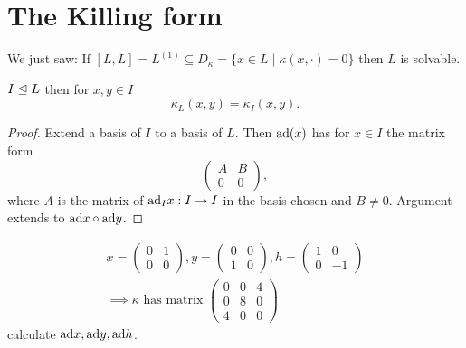 \section{The Killing form}
We just saw: If $[L,L]=L^{(1)} \subseteq D_\kappa=\{x \in L \mid \kappa(x, \cdot)=0\}$
then $L$ is solvable.

\begin{lemma}
    $I \trianglelefteq L$ then for $x,y \in I$
    $$ \kappa_L(x,y) = \kappa_I(x,y).$$
\end{lemma}
\begin{proof}
    Extend a basis of $I$ to a basis of $L$. Then $\text{ad} (x)$ has for $x \in I$ the matrix form
    $$ \begin{pmatrix}
        A & B\\
        0 & 0
    \end{pmatrix},$$
    where $A$ is the matrix of $\text{ad}_I x: I \to I$ in the basis chosen and $B \neq 0$.
    Argument extends to $\text{ad} x \circ \text{ad} y$.
\end{proof}

\begin{example}
    \begin{align*}
        x = \begin{pmatrix}
            0 & 1\\
            0 & 0
        \end{pmatrix},
        y = \begin{pmatrix}
            0 & 0\\
            1 & 0
        \end{pmatrix},
        h = \begin{pmatrix}
            1 & 0\\
            0 & -1
        \end{pmatrix}\\
        \implies \kappa \text{ has matrix } \begin{pmatrix}
            0 & 0 & 4\\
            0 & 8 & 0\\
            4 & 0 & 0
        \end{pmatrix}
    \end{align*}
    calculate $\text{ad} x, \text{ad} y, \text{ad} h$.
\end{example}
